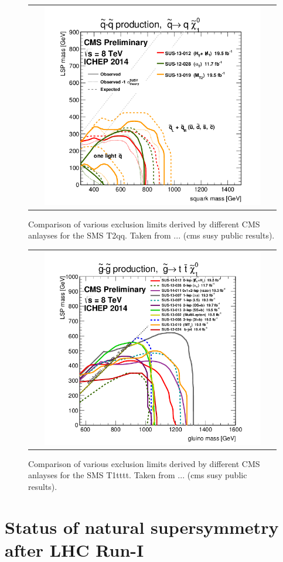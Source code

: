 \begin{figure}[!tp]
  \centering
  \begin{tabular}{c}
    \includegraphics[width=0.9\textwidth]{figures/T2_ICHEP2014.png}
  \end{tabular}
  \caption{Comparison of various exclusion limits derived by different CMS anlayses for the SMS T2qq. Taken from ... (cms susy public results).}
  \label{fig:T1_comp}
\end{figure}

\begin{figure}[!tp]
  \centering
  \begin{tabular}{c}
    \includegraphics[width=0.9\textwidth]{figures/T1tttt_ICHEP2014_All.png}
  \end{tabular}
  \caption{Comparison of various exclusion limits derived by different CMS anlayses for the SMS T1tttt. Taken from ... (cms susy public results).}
  \label{fig:T1_comp}
\end{figure}

\section{Status of natural supersymmetry after LHC Run-I}
\label{sec:susy_status}



